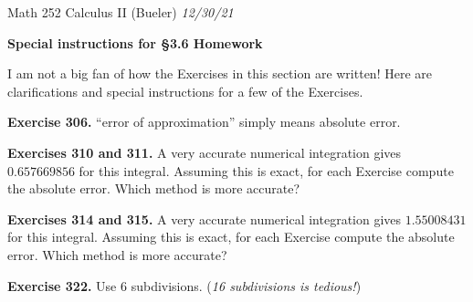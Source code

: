 \documentclass[12pt]{amsart}
\begin{document}
\scriptsize \noindent Math 252 Calculus II (Bueler) \hfill \emph{12/30/21}
\normalsize

\Large
\bigskip
\centerline{\textbf{Special instructions for \S 3.6 Homework}}
\medskip
\normalsize

\thispagestyle{empty}

\bigskip

I am not a big fan of how the Exercises in this section are written!  Here are clarifications and special instructions for a few of the Exercises.

\bigskip
\noindent \textbf{Exercise 306.}  ``error of approximation'' simply means absolute error.

\medskip
\noindent \textbf{Exercises 310 and 311.}  A very accurate numerical integration gives $0.657669856$ for this integral.  Assuming this is exact, for each Exercise compute the absolute error.  Which method is more accurate?

\medskip
\noindent \textbf{Exercises 314 and 315.}  A very accurate numerical integration gives $1.55008431$ for this integral.  Assuming this is exact, for each Exercise compute the absolute error.  Which method is more accurate?

\medskip
\noindent \textbf{Exercise 322.}  Use 6 subdivisions.  (\emph{16 subdivisions is tedious!})
\end{document}
